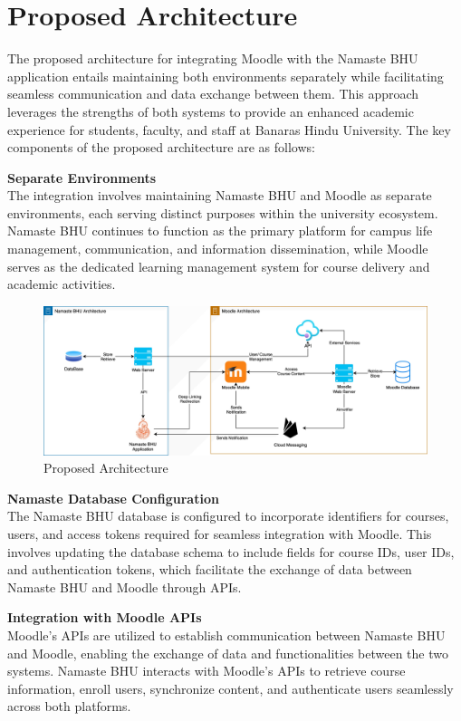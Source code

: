 \section{Proposed Architecture}

The proposed architecture for integrating Moodle with the Namaste BHU application entails maintaining both environments separately while facilitating seamless communication and data exchange between them. This approach leverages the strengths of both systems to provide an enhanced academic experience for students, faculty, and staff at Banaras Hindu University. The key components of the proposed architecture are as follows:

\textbf{Separate Environments}\\
The integration involves maintaining Namaste BHU and Moodle as separate environments, each serving distinct purposes within the university ecosystem. Namaste BHU continues to function as the primary platform for campus life management, communication, and information dissemination, while Moodle serves as the dedicated learning management system for course delivery and academic activities.

\begin{figure}[h]
    \centering
    \includegraphics[width=\linewidth]{assets/img/proposed-arch.jpg}
    \caption{Proposed Architecture}
    \label{fig:proposed-arch}
\end{figure}

\textbf{Namaste Database Configuration}\\
The Namaste BHU database is configured to incorporate identifiers for courses, users, and access tokens required for seamless integration with Moodle. This involves updating the database schema to include fields for course IDs, user IDs, and authentication tokens, which facilitate the exchange of data between Namaste BHU and Moodle through APIs.

\textbf{Integration with Moodle APIs}\\
Moodle's APIs are utilized to establish communication between Namaste BHU and Moodle, enabling the exchange of data and functionalities between the two systems. Namaste BHU interacts with Moodle's APIs to retrieve course information, enroll users, synchronize content, and authenticate users seamlessly across both platforms.\\

